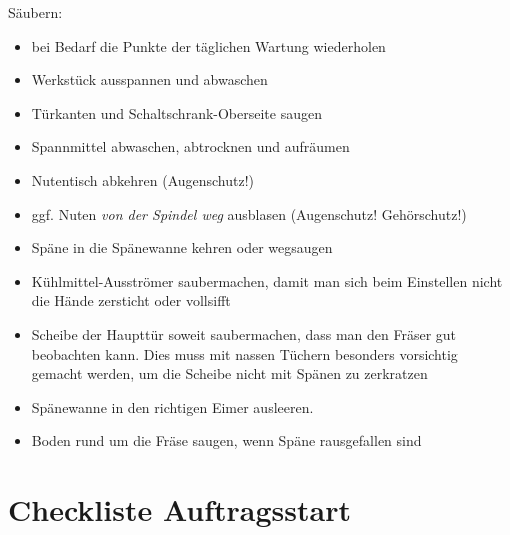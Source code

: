 \documentclass{\basedir/fablab-document}
\begin{document}
Säubern:
\begin{itemize}
	\item bei Bedarf die Punkte der täglichen Wartung wiederholen
	\item Werkstück ausspannen und abwaschen
	\item Türkanten und Schaltschrank-Oberseite saugen
	\item Spannmittel abwaschen, abtrocknen und aufräumen
	\item Nutentisch abkehren (Augenschutz!)
	\item ggf. Nuten \emph{von der Spindel weg} ausblasen (Augenschutz! Gehörschutz!)
	\item Späne in die Spänewanne kehren oder wegsaugen
	\item Kühlmittel-Ausströmer saubermachen, damit man sich beim Einstellen nicht die Hände zersticht oder vollsifft
	\item Scheibe der Haupttür soweit saubermachen, dass man den Fräser gut beobachten kann. Dies muss mit nassen Tüchern besonders vorsichtig gemacht werden, um die Scheibe nicht mit Spänen zu zerkratzen
	\item Spänewanne in den richtigen Eimer ausleeren.
	\item Boden rund um die Fräse saugen, wenn Späne rausgefallen sind
\end{itemize}

\section{Checkliste Auftragsstart}
\end{document}
